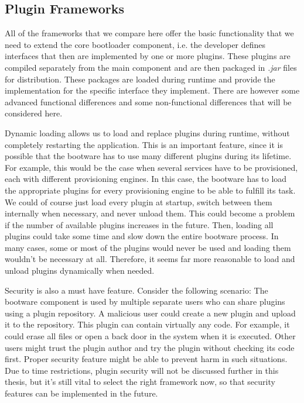 \subsection{Plugin Frameworks}
\label{pluginframeworks}

All of the frameworks that we compare here offer the basic functionality that we need to extend the core bootloader component, i.e. the developer defines interfaces that then are implemented by one or more plugins.
These plugins are compiled separately from the main component and are then packaged in \textit{.jar} files for distribution.
These packages are loaded during runtime and provide the implementation for the specific interface they implement.
There are however some advanced functional differences and some non-functional differences that will be considered here.

Dynamic loading allows us to load and replace plugins during runtime, without completely restarting the application.
This is an important feature, since it is possible that the bootware has to use many different plugins during its lifetime.
For example, this would be the case when several services have to be provisioned, each with different provisioning engines.
In this case, the bootware has to load the appropriate plugins for every provisioning engine to be able to fulfill its task.
We could of course just load every plugin at startup, switch between them internally when necessary, and never unload them.
This could become a problem if the number of available plugins increases in the future.
Then, loading all plugins could take some time and slow down the entire bootware process.
In many cases, some or most of the plugins would never be used and loading them wouldn't be necessary at all.
Therefore, it seems far more reasonable to load and unload plugins dynamically when needed.

Security is also a must have feature.
Consider the following scenario: The bootware component is used by multiple separate users who can share plugins using a plugin repository.
A malicious user could create a new plugin and upload it to the repository.
This plugin can contain virtually any code.
For example, it could erase all files or open a back door in the system when it is executed.
Other users might trust the plugin author and try the plugin without checking its code first.
Proper security feature might be able to prevent harm in such situations.
Due to time restrictions, plugin security will not be discussed further in this thesis, but it's still vital to select the right framework now, so that security features can be implemented in the future.

